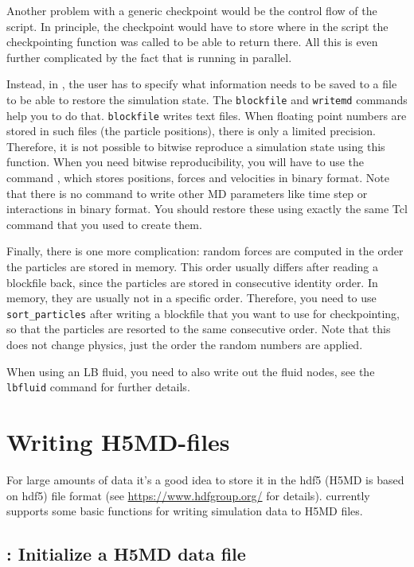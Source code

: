 Another problem with a generic checkpoint would be the control flow of
the script. In principle, the checkpoint would have to store where in
the script the checkpointing function was called to be able to return
there.  All this is even further complicated by the fact that \es is
running in parallel.

Instead, in \es, the user has to specify what information needs to be
saved to a file to be able to restore the simulation state.  The
\texttt{blockfile} and \texttt{writemd} commands help you to do that.
\texttt{blockfile} writes text files.  When floating point numbers are
stored in such files (\eg the particle positions), there is only a
limited precision.  Therefore, it is not possible to bitwise reproduce
a simulation state using this function. When you need bitwise
reproducibility, you will have to use the command , which
stores positions, forces and velocities in binary format.  Note that
there is no command to write other MD parameters like time step or
interactions in binary format. You should restore these using exactly
the same Tcl command that you used to create them.

Finally, there is one more complication: random forces are computed
in the order the particles are stored in memory. This order usually
differs after reading a blockfile back, since the particles are
stored in consecutive identity order. In memory, they are usually
not in a specific order. Therefore, you need to use \texttt{sort_particles}
after writing a blockfile that you want to use for checkpointing, so
that the particles are resorted to the same consecutive order. Note
that this does not change physics, just the order the random numbers
are applied.

When using an LB fluid, you need to also write out the fluid nodes,
see the \texttt{lbfluid} command for further details.



\section{Writing H5MD-files}
For large amounts of data it's a good idea to store it in the hdf5 (H5MD is
based on hdf5) file format
(see \url{https://www.hdfgroup.org/} for details). \es currently supports
some basic functions for writing simulation data to H5MD files.
\subsection{: Initialize a H5MD data file}

